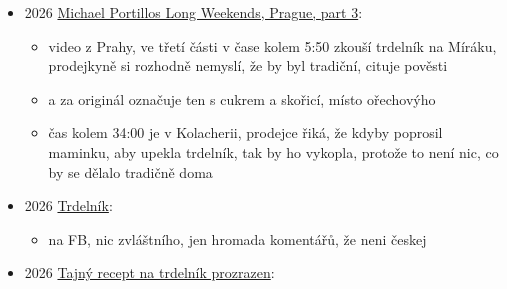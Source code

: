 \begin{itemize}
  \begin{itemize}
  \tightlist
  \item
    Rádio Slovensko, pořad, kde se vypráví různý pověsti
  \item
    název trdlo má pocházet z toho, že dřevo je tvrdé (tvrdlo)

    \begin{itemize}
    \tightlist
    \item
      podle etymologického slovníku jazyka českého je trdlo odvozený od
      tříti, protože se s ním tře v hmoždíři
    \end{itemize}
  \item
    jinak je to klasický vyprávění pověsti o Gvadánim, s tím, že v
    Transylváni měl jen bojovat, ale původně pocházel ze Skalice (ve
    skutečnosti se narodil ve městě Rudabánya v severovýchodním
    Maďarsku)
  \item
    jak tak koukám na maďarský wiki na článek o Gvadányim, tak vlastně s
    Transylvánií ani neměl nic moc společnýho, vůbec tam nevidím, že by
    v Transylvánii skutečně působil
  \end{itemize}
\item
  2026 \href{https://www.youtube.com/watch?v=5vZZLjZrYeE&t=470s}{Michael
  Portillo\textquotesingle s Long Weekends, Prague, part 3}:

  \begin{itemize}
  \tightlist
  \item
    video z Prahy, ve třetí části v čase kolem 5:50 zkouší trdelník na
    Míráku, prodejkyně si rozhodně nemyslí, že by byl tradiční, cituje
    pověsti
  \item
    a za originál označuje ten s cukrem a skořicí, místo ořechovýho
  \item
    čas kolem 34:00 je v Kolacherii, prodejce řiká, že kdyby poprosil
    maminku, aby upekla trdelník, tak by ho vykopla, protože to není
    nic, co by se dělalo tradičně doma
  \end{itemize}
\item
  2026
  \href{https://www.facebook.com/permalink.php?story_fbid=pfbid0HsQNFxqgVqTqaoJ6v1hrywXrCr5eBpTodyBnriDZYWBCng8indVFHEJXq2krdvahl&id=61573116794279}{Trdelník}:

  \begin{itemize}
  \tightlist
  \item
     na FB, nic zvláštního, jen hromada komentářů, že
    neni českej
  \end{itemize}
\item
  2026 \href{https://www.youtube.com/watch?v=asrWa0ncm0g}{Tajný recept
  na trdelník prozrazen}:


\end{itemize}

